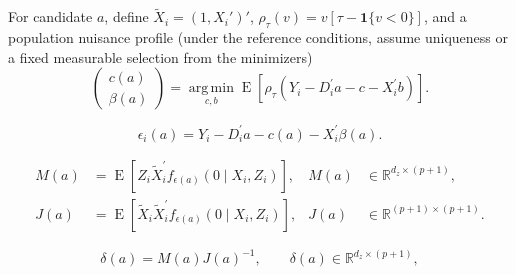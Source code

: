 For candidate $a$, define $\widetilde X_i=(1,X_i')'$, $\rho_\tau(v)=v[\tau-\mathbf1\{v<0\}]$, and a population nuisance profile (under the reference conditions, assume uniqueness or a fixed measurable selection from the minimizers)
\begin{equation}
    \begin{pmatrix}
        c(a)\\
        \beta(a)
    \end{pmatrix}
    = \operatorname*{arg\,min}_{c,b}
      \operatorname{E}\!\left[
          \rho_{\tau}\!\left(Y_i-D_i^{\prime}a-c-X_i^{\prime}b\right)
      \right].
    \label{eq:profile-beta}
\end{equation}

\begin{equation}
    \epsilon_i(a)
    =Y_i-D_i^{\prime}a-c(a)-X_i^{\prime}\beta(a).
    \label{eq:profile-residual}
\end{equation}

\begin{equation}
    \begin{aligned}
        M(a)
        &=\operatorname{E}\!\left[
            Z_i\widetilde X_i^{\prime}f_{\epsilon(a)}(0\mid X_i,Z_i)
        \right],
        & M(a)&\in\mathbb{R}^{d_z\times(p+1)},\\
        J(a)
        &=\operatorname{E}\!\left[
            \widetilde X_i\widetilde X_i^{\prime}f_{\epsilon(a)}(0\mid X_i,Z_i)
        \right],
        & J(a)&\in\mathbb{R}^{(p+1)\times(p+1)}.
    \end{aligned}
    \label{eq:profile-MJ}
\end{equation}

\begin{equation}
    \delta(a)=M(a)J(a)^{-1},
    \qquad
    \delta(a)\in\mathbb{R}^{d_z\times(p+1)},
    \label{eq:profile-delta}
\end{equation}

